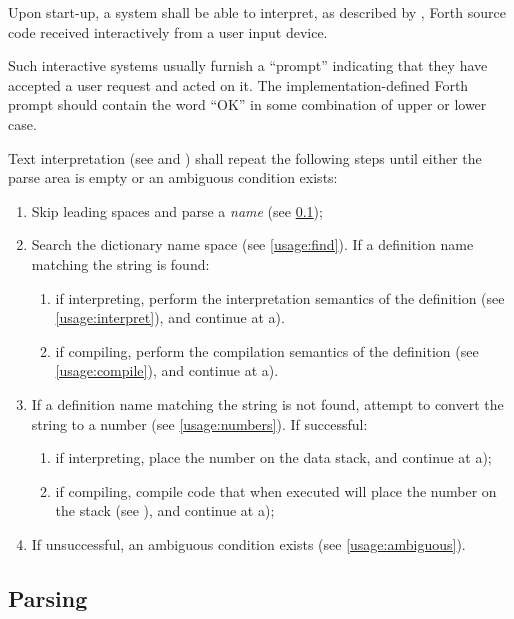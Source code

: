 Upon start-up, a system shall be able to interpret, as described
by , Forth source code received interactively
from a user input device.

Such interactive systems usually furnish a ``prompt'' indicating
that they have accepted a user request and acted on it. The
implementation-defined Forth prompt should contain the word ``OK''
in some combination of upper or lower case.

Text interpretation (see  and
) shall repeat the following steps until
either the parse area is empty or an ambiguous condition exists:

\begin{enumerate}
\item Skip leading spaces and parse a \emph{name}
	(see \ref{usage:parsing});

\item Search the dictionary name space (see \ref{usage:find}).
	If a definition name matching the string is found:

	\begin{enumerate}
	\item if interpreting, perform the interpretation semantics of
		the definition (see \ref{usage:interpret}), and continue at
		a).

	\item if compiling, perform the compilation semantics of the
		definition (see \ref{usage:compile}), and continue at a).
	\end{enumerate}

\item If a definition name matching the string is not found,
	attempt to convert the string to a number
	(see \ref{usage:numbers}). If successful:
	\begin{enumerate}
	\item if interpreting, place the number on the data stack,
		and continue at a);
	\item if compiling, compile code that when executed will place
		the number on the stack (see ),
		and continue at a);
	\end{enumerate}

\item If unsuccessful, an ambiguous condition exists
	(see \ref{usage:ambiguous}).
\end{enumerate}

\subsection{Parsing} %
\label{usage:parsing}


